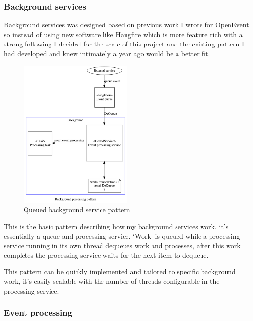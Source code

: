 \subsubsection{Background services}

Background services was designed based on previous work I wrote for \href{https://github.com/mrharrisonbarker/openevent}{OpenEvent} so instead of using new software like \href{https://www.hangfire.io/}{Hangfire} which is more feature rich with a strong following I decided for the scale of this project and the existing pattern I had developed and knew intimately a year ago would be a better fit.

\begin{figure}[H]
\caption{Queued background service pattern}
\centering
\includegraphics[width=0.5\textwidth,height=0.5\textheight,keepaspectratio]{images/patterns/background-processing-pattern}
\end{figure}

This is the basic pattern describing how my background services work, it's essentially a queue and processing service. `Work' is queued while a processing service running in its own thread dequeues work and processes, after this work completes the processing service waits for the next item to dequeue.

This pattern can be quickly implemented and tailored to specific background work, it's easily scalable with the number of threads configurable in the processing service.

\subsubsection{Event processing}

